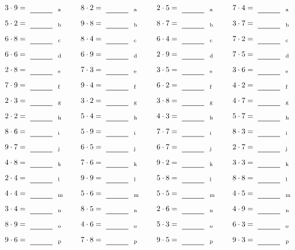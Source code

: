 \documentclass
[
  draft    = true,
  fontsize = 11pt,
  parskip  = half-
]
{scrartcl}
\begin{document}
\par\vfill\par
\begin{align*}
    \pline{3\cdot9}&=\rline{a}
  & \pline{8\cdot2}&=\rline{a}
  & \pline{2\cdot5}&=\rline{a}
  & \pline{7\cdot4}&=\rline{a} \\[1ex]
    \pline{5\cdot2}&=\rline{b}
  & \pline{9\cdot8}&=\rline{b}
  & \pline{8\cdot7}&=\rline{b}
  & \pline{3\cdot7}&=\rline{b} \\[1ex]
    \pline{6\cdot8}&=\rline{c}
  & \pline{8\cdot4}&=\rline{c}
  & \pline{6\cdot4}&=\rline{c}
  & \pline{7\cdot2}&=\rline{c} \\[1ex]
    \pline{6\cdot6}&=\rline{d}
  & \pline{6\cdot9}&=\rline{d}
  & \pline{2\cdot9}&=\rline{d}
  & \pline{7\cdot5}&=\rline{d} \\[1ex]
    \pline{2\cdot8}&=\rline{e}
  & \pline{7\cdot3}&=\rline{e}
  & \pline{3\cdot5}&=\rline{e}
  & \pline{3\cdot6}&=\rline{e} \\[1ex]
    \pline{7\cdot9}&=\rline{f}
  & \pline{9\cdot4}&=\rline{f}
  & \pline{6\cdot2}&=\rline{f}
  & \pline{4\cdot2}&=\rline{f} \\[1ex]
    \pline{2\cdot3}&=\rline{g}
  & \pline{3\cdot2}&=\rline{g}
  & \pline{3\cdot8}&=\rline{g}
  & \pline{4\cdot7}&=\rline{g} \\[1ex]
    \pline{2\cdot2}&=\rline{h}
  & \pline{5\cdot4}&=\rline{h}
  & \pline{4\cdot3}&=\rline{h}
  & \pline{5\cdot7}&=\rline{h} \\[1ex]
    \pline{8\cdot6}&=\rline{i}
  & \pline{5\cdot9}&=\rline{i}
  & \pline{7\cdot7}&=\rline{i}
  & \pline{8\cdot3}&=\rline{i} \\[1ex]
    \pline{9\cdot7}&=\rline{j}
  & \pline{6\cdot5}&=\rline{j}
  & \pline{6\cdot7}&=\rline{j}
  & \pline{2\cdot7}&=\rline{j} \\[1ex]
    \pline{4\cdot8}&=\rline{k}
  & \pline{7\cdot6}&=\rline{k}
  & \pline{9\cdot2}&=\rline{k}
  & \pline{3\cdot3}&=\rline{k} \\[1ex]
    \pline{2\cdot4}&=\rline{l}
  & \pline{9\cdot9}&=\rline{l}
  & \pline{5\cdot8}&=\rline{l}
  & \pline{8\cdot8}&=\rline{l} \\[1ex]
    \pline{4\cdot4}&=\rline{m}
  & \pline{5\cdot6}&=\rline{m}
  & \pline{5\cdot5}&=\rline{m}
  & \pline{4\cdot5}&=\rline{m} \\[1ex]
    \pline{3\cdot4}&=\rline{n}
  & \pline{8\cdot5}&=\rline{n}
  & \pline{2\cdot6}&=\rline{n}
  & \pline{4\cdot9}&=\rline{n} \\[1ex]
    \pline{8\cdot9}&=\rline{o}
  & \pline{4\cdot6}&=\rline{o}
  & \pline{5\cdot3}&=\rline{o}
  & \pline{6\cdot3}&=\rline{o} \\[1ex]
    \pline{9\cdot6}&=\rline{p}
  & \pline{7\cdot8}&=\rline{p}
  & \pline{9\cdot5}&=\rline{p}
  & \pline{9\cdot3}&=\rline{p}
\end{align*}
\end{document}
